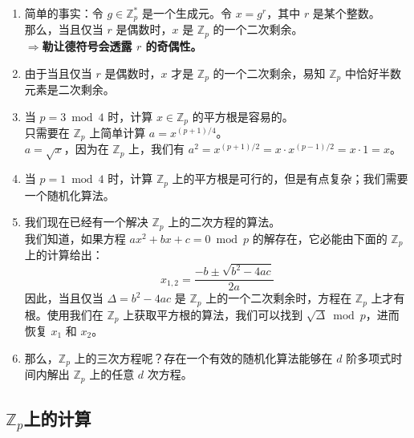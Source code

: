 \begin{enumerate}
	\item 简单的事实：令 $g\in\mathbb{Z}_p^*$ 是一个生成元。令 $x=g^r$，其中 $r$ 是某个整数。\\
    那么，当且仅当 $r$ 是偶数时，$x$ 是 $\mathbb{Z}_p$ 的一个二次剩余。\\
    $\Longrightarrow$\quad \textbf{勒让德符号会透露 $r$ 的奇偶性。}
	\item 由于当且仅当 $r$ 是偶数时，$x$ 才是 $\mathbb{Z}_p$ 的一个二次剩余，易知 $\mathbb{Z}_p$ 中恰好半数元素是二次剩余。
	\item 当 $p=3 \bmod 4$ 时，计算 $x\in\mathbb{Z}_p$ 的平方根是容易的。\\
    只需要在 $\mathbb{Z}_p$ 上简单计算 $a=x^{(p+1)/4}$。\\
    $a=\sqrt{x}$，因为在 $\mathbb{Z}_p$ 上，我们有 $a^2=x^{(p+1)/2}=x\cdot x^{(p-1)/2}=x\cdot 1=x$。
	\item 当 $p=1 \bmod 4$ 时，计算 $\mathbb{Z}_p$ 上的平方根是可行的，但是有点复杂；我们需要一个随机化算法。
	\item 我们现在已经有一个解决  $\mathbb{Z}_p$ 上的二次方程的算法。\\
    我们知道，如果方程 $ax^2+bx+c=0 \bmod p$ 的解存在，它必能由下面的 $\mathbb{Z}_p$ 上的计算给出：
    \[
    x_{1,2}=\frac{-b\pm\sqrt{b^2-4ac}}{2a}
    \]
    因此，当且仅当 $\Delta=b^2-4ac$ 是 $\mathbb{Z}_p$ 上的一个二次剩余时，方程在 $\mathbb{Z}_p$ 上才有根。使用我们在 $\mathbb{Z}_p$ 上获取平方根的算法，我们可以找到 $\sqrt{\Delta} \bmod p$，进而恢复 $x_1$ 和 $x_2$。
	\item 那么，$\mathbb{Z}_p$ 上的三次方程呢？存在一个有效的随机化算法能够在 $d$ 阶多项式时间内解出 $\mathbb{Z}_p$ 上的任意 $d$ 次方程。
\end{enumerate}

\subsection{$\mathbb{Z}_p$上的计算}\label{subsec:A-2-4}


